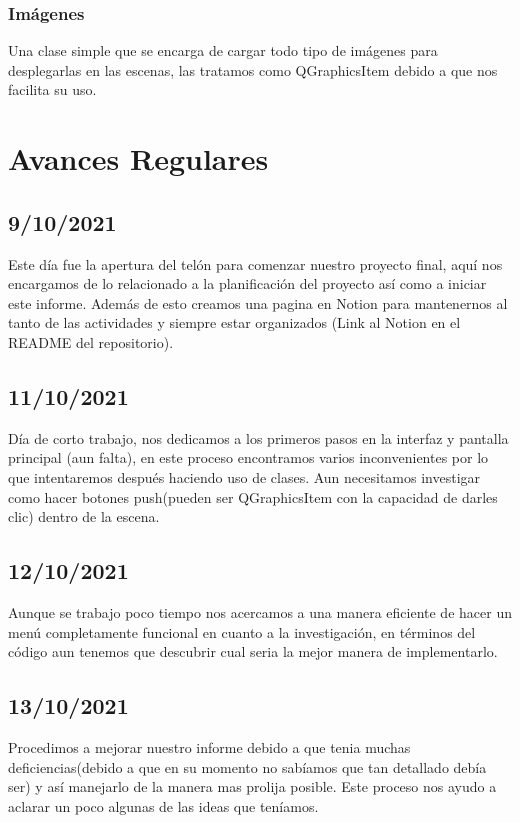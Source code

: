 \documentclass{article}
\begin{document}
            \subsubsection{Imágenes}
            Una clase simple que se encarga de cargar todo tipo de imágenes para desplegarlas en las escenas, las tratamos como QGraphicsItem debido a que nos facilita su uso.

\section{Avances Regulares}
    \subsection{9/10/2021}
        Este día fue la apertura del telón para comenzar nuestro proyecto final, aquí nos encargamos de lo relacionado a la planificación del proyecto así como a iniciar este informe. Además de esto creamos una pagina en Notion para mantenernos al tanto de las actividades y siempre estar organizados (Link al Notion en el README del repositorio).
        
    \subsection{11/10/2021}
        Día de corto trabajo, nos dedicamos a los primeros pasos en la interfaz y pantalla principal (aun falta), en este proceso encontramos varios inconvenientes por lo que intentaremos después haciendo uso de clases. Aun necesitamos investigar como hacer botones push(pueden ser QGraphicsItem con la capacidad de darles clic) dentro de la escena.
        
    \subsection{12/10/2021}
        Aunque se trabajo poco tiempo nos acercamos a una manera eficiente de hacer un menú completamente funcional en cuanto a la investigación, en términos del código aun tenemos que descubrir cual seria la mejor manera de implementarlo.
        
    \subsection{13/10/2021}
        Procedimos a mejorar nuestro informe debido a que tenia muchas deficiencias(debido a que en su momento no sabíamos que tan detallado debía ser) y así manejarlo de la manera mas prolija posible. Este proceso nos ayudo a aclarar un poco algunas de las ideas que teníamos.
        
\end{document}
